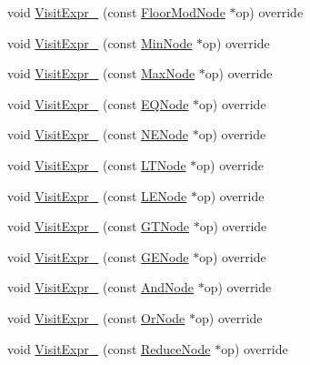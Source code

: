 \begin{DoxyCompactItemize}
\item 
void \hyperlink{classtvm_1_1tir_1_1ExprVisitor_a001e91c6f7458afcc8f7433c5714dc38}{Visit\+Expr\+\_\+} (const \hyperlink{classtvm_1_1tir_1_1FloorModNode}{Floor\+Mod\+Node} $\ast$op) override
\item 
void \hyperlink{classtvm_1_1tir_1_1ExprVisitor_af5c92682a0fc192aa04c486bb8a9c07c}{Visit\+Expr\+\_\+} (const \hyperlink{classtvm_1_1tir_1_1MinNode}{Min\+Node} $\ast$op) override
\item 
void \hyperlink{classtvm_1_1tir_1_1ExprVisitor_a84893defaf52042718eadb5e7c4c40bb}{Visit\+Expr\+\_\+} (const \hyperlink{classtvm_1_1tir_1_1MaxNode}{Max\+Node} $\ast$op) override
\item 
void \hyperlink{classtvm_1_1tir_1_1ExprVisitor_ab6e54dd3e43497fc0fa6fc02cf04d86a}{Visit\+Expr\+\_\+} (const \hyperlink{classtvm_1_1tir_1_1EQNode}{E\+Q\+Node} $\ast$op) override
\item 
void \hyperlink{classtvm_1_1tir_1_1ExprVisitor_a0f5b65f0944eacc6401c8e02cb7ecd63}{Visit\+Expr\+\_\+} (const \hyperlink{classtvm_1_1tir_1_1NENode}{N\+E\+Node} $\ast$op) override
\item 
void \hyperlink{classtvm_1_1tir_1_1ExprVisitor_ae8b5c68f5ad28542328676dca89dec5c}{Visit\+Expr\+\_\+} (const \hyperlink{classtvm_1_1tir_1_1LTNode}{L\+T\+Node} $\ast$op) override
\item 
void \hyperlink{classtvm_1_1tir_1_1ExprVisitor_a092a9c1077a6b50fd3e7d13643446eb0}{Visit\+Expr\+\_\+} (const \hyperlink{structtvm_1_1tir_1_1LENode}{L\+E\+Node} $\ast$op) override
\item 
void \hyperlink{classtvm_1_1tir_1_1ExprVisitor_a80845900e297ba27e9700b4e8b827118}{Visit\+Expr\+\_\+} (const \hyperlink{classtvm_1_1tir_1_1GTNode}{G\+T\+Node} $\ast$op) override
\item 
void \hyperlink{classtvm_1_1tir_1_1ExprVisitor_abd7bb2cf89bbd693ba682dc989fb8924}{Visit\+Expr\+\_\+} (const \hyperlink{classtvm_1_1tir_1_1GENode}{G\+E\+Node} $\ast$op) override
\item 
void \hyperlink{classtvm_1_1tir_1_1ExprVisitor_ab8beb3f112fe52825a3894a5de47ed4c}{Visit\+Expr\+\_\+} (const \hyperlink{classtvm_1_1tir_1_1AndNode}{And\+Node} $\ast$op) override
\item 
void \hyperlink{classtvm_1_1tir_1_1ExprVisitor_a1e06eb2730080b3c5b2bb9450b5df9aa}{Visit\+Expr\+\_\+} (const \hyperlink{classtvm_1_1tir_1_1OrNode}{Or\+Node} $\ast$op) override
\item 
void \hyperlink{classtvm_1_1tir_1_1ExprVisitor_ac42b57f542bac6ec73fd05bdf9e77fa0}{Visit\+Expr\+\_\+} (const \hyperlink{classtvm_1_1tir_1_1ReduceNode}{Reduce\+Node} $\ast$op) override

\end{DoxyCompactItemize}
